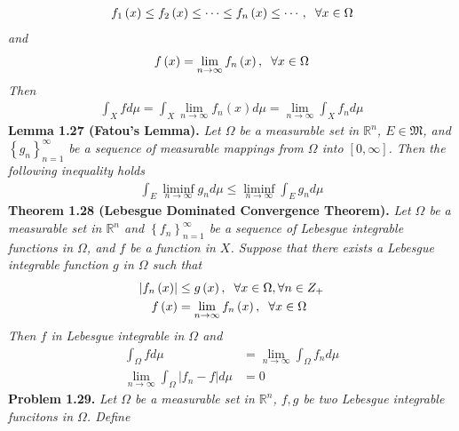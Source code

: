 \documentclass[a4paper]{article}
\numberwithin{equation}{section}
\begin{document}
\begin{align}
{f_1}\left( x \right) \le {f_2}\left( x \right) \le  \cdots  \le {f_n}\left( x \right) \le  \cdots ,\hspace{0.2cm}\forall x \in \Omega 
\end{align}
\textit{and}
\begin{align}
f\left( x \right) = \mathop {\lim }\limits_{n \to \infty } {f_n}\left( x \right),\hspace{0.2cm}\forall x \in \Omega 
\end{align}
\textit{Then}
\begin{align}
\int_X {fd\mu }  = \int_X {\mathop {\lim }\limits_{n \to \infty } {f_n}\left( x \right)d\mu }  = \mathop {\lim }\limits_{n \to \infty } \int_X {{f_n}d\mu } 
\end{align}
\textbf{Lemma 1.27 (Fatou's Lemma).} \textit{Let $\Omega$ be a measurable set in $\mathbb{R}^n$, $E\in \mathfrak{M}$, and $\left\{ {{g_n}} \right\}_{n = 1}^\infty $ be a sequence of measurable mappings from $\Omega$ into $\left[0,\infty\right]$. Then the following inequality holds}
\begin{align}
\int_E {\mathop {\lim \inf }\limits_{n \to \infty } {g_n}d\mu }  \le \mathop {\lim \inf }\limits_{n \to \infty } \int_E {{g_n}d\mu } 
\end{align}
\textbf{Theorem 1.28 (Lebesgue Dominated Convergence Theorem).} \textit{Let $\Omega$ be a measurable set in $\mathbb{R}^n$ and $\left\{ {{f_n}} \right\}_{n = 1}^\infty $  be a sequence of Lebesgue integrable functions in $\Omega$, and $f$ be a function in $X$. Suppose that there exists a Lebesgue integrable function $g$ in $\Omega$ such that}
\begin{align}
\left| {{f_n}\left( x \right)} \right| &\le g\left( x \right),\hspace{0.2cm}\forall x \in \Omega ,\forall n \in {Z_ + }\\
f\left( x \right) &= \mathop {\lim }\limits_{n \to \infty } {f_n}\left( x \right),\hspace{0.2cm}\forall x \in \Omega 
\end{align}
\textit{Then $f$ in Lebesgue integrable in $\Omega$ and}
\begin{align}
\int_\Omega  {fd\mu }  &= \mathop {\lim }\limits_{n \to \infty } \int_\Omega  {{f_n}d\mu } \\
\mathop {\lim }\limits_{n \to \infty } \int_\Omega  {\left| {{f_n} - f} \right|d\mu }  &= 0
\end{align}
\textbf{Problem 1.29.} \textit{Let $\Omega$ be a measurable set in $\mathbb{R}^n$, $f,g$ be two Lebesgue integrable funcitons in $\Omega$. Define}
\end{document}
